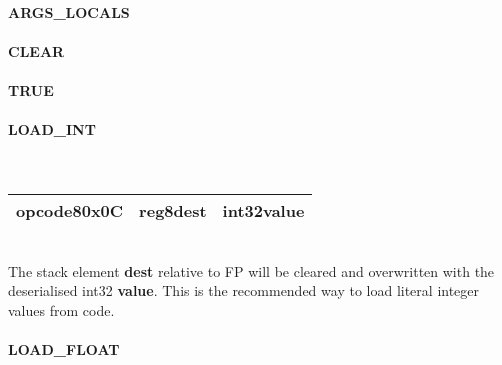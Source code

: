 \documentclass[12pt,a4paper]{article}
\begin{document}
\vspace{2em}\begin{minipage}{\textwidth}
\paragraph{ARGS\_LOCALS}
\end{minipage}

\vspace{2em}\begin{minipage}{\textwidth}
\paragraph{CLEAR}
\end{minipage}

\vspace{2em}\begin{minipage}{\textwidth}
\paragraph{TRUE}
\end{minipage}

\vspace{2em}\begin{minipage}{\textwidth}
\paragraph{LOAD\_INT}
~\vspace{1em}\\\begin{tabular}{|p{2cm}|p{2cm}|p{8cm}|}
\hline
opcode8\newline\textbf{0x0C} & reg8\newline\textbf{dest} & int32\newline\textbf{value} \\
\hline
\end{tabular}\vspace{1em}\\
The stack element \textbf{dest} relative to FP will be cleared and overwritten with the deserialised int32 \textbf{value}. This is the recommended way to load literal integer values from code.
\end{minipage}

\vspace{2em}\begin{minipage}{\textwidth}
\paragraph{LOAD\_FLOAT}
\end{minipage}
\end{document}
